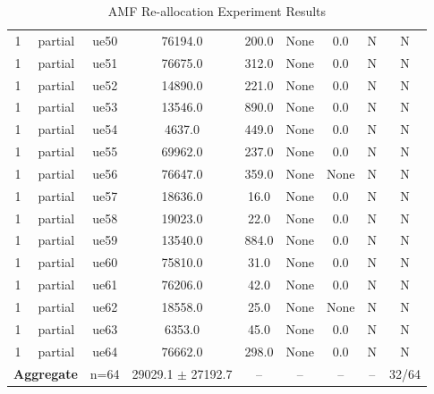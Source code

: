 \begin{table}[ht]
\begin{tabular}{|c|c|c|c|c|c|c|c|c|}
1 & partial & ue50 & 76194.0 & 200.0 & None & 0.0 & N & N \\
1 & partial & ue51 & 76675.0 & 312.0 & None & 0.0 & N & N \\
1 & partial & ue52 & 14890.0 & 221.0 & None & 0.0 & N & N \\
1 & partial & ue53 & 13546.0 & 890.0 & None & 0.0 & N & N \\
1 & partial & ue54 & 4637.0 & 449.0 & None & 0.0 & N & N \\
1 & partial & ue55 & 69962.0 & 237.0 & None & 0.0 & N & N \\
1 & partial & ue56 & 76647.0 & 359.0 & None & None & N & N \\
1 & partial & ue57 & 18636.0 & 16.0 & None & 0.0 & N & N \\
1 & partial & ue58 & 19023.0 & 22.0 & None & 0.0 & N & N \\
1 & partial & ue59 & 13540.0 & 884.0 & None & 0.0 & N & N \\
1 & partial & ue60 & 75810.0 & 31.0 & None & 0.0 & N & N \\
1 & partial & ue61 & 76206.0 & 42.0 & None & 0.0 & N & N \\
1 & partial & ue62 & 18558.0 & 25.0 & None & None & N & N \\
1 & partial & ue63 & 6353.0 & 45.0 & None & 0.0 & N & N \\
1 & partial & ue64 & 76662.0 & 298.0 & None & 0.0 & N & N \\
\multicolumn{2}{|c|}{\textbf{Aggregate}} & n=64 & 29029.1 $\pm$ 27192.7 & -- & -- & -- & -- & 32/64 \\
\hline
\end{tabular}
\caption{AMF Re-allocation Experiment Results}
\label{tab:amf_realloc}
\end{table}

